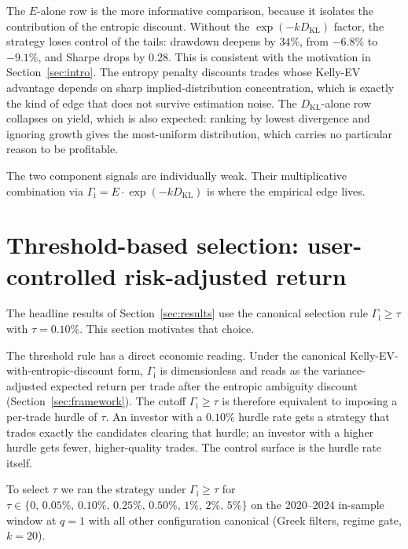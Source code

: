 \documentclass[11pt]{article}
\theoremstyle{definition}
\theoremstyle{remark}
\newcommand{\KL}{D_{\mathrm{KL}}}
\newcommand{\GROUND}{\Gamma_{\mathrm{i}}}
\begin{document}
The $E$-alone row is the more informative comparison, because it
isolates the contribution of the entropic discount. Without the
$\exp(-k \KL)$ factor, the strategy loses control of the tails:
drawdown deepens by $34\%$, from $-6.8\%$ to $-9.1\%$, and
Sharpe drops by $0.28$. This is consistent with the motivation in
Section~\ref{sec:intro}. The entropy penalty discounts trades whose
Kelly-EV advantage depends on sharp implied-distribution
concentration, which is exactly the kind of edge that does not
survive estimation noise. The $\KL$-alone row collapses on yield,
which is also expected: ranking by lowest divergence and ignoring
growth gives the most-uniform distribution, which carries no
particular reason to be profitable.

The two component signals are individually weak. Their
multiplicative combination via $\GROUND = E \cdot \exp(-k \KL)$ is
where the empirical edge lives.

\section{Threshold-based selection: user-controlled risk-adjusted return}\label{sec:threshold}

The headline results of Section~\ref{sec:results} use the canonical
selection rule $\GROUND \geq \tau$ with $\tau = 0.10\%$. This
section motivates that choice.

The threshold rule has a direct economic reading. Under the
canonical Kelly-EV-with-entropic-discount form, $\GROUND$ is
dimensionless and reads as the variance-adjusted expected return per trade
after the entropic ambiguity discount (Section~\ref{sec:framework}). The cutoff
$\GROUND \geq \tau$ is therefore equivalent to imposing a per-trade
hurdle of $\tau$. An investor with a $0.10\%$ hurdle rate gets
a strategy that trades exactly the candidates clearing that
hurdle; an investor with a higher hurdle gets fewer,
higher-quality trades. The control surface is the hurdle rate
itself.

To select $\tau$ we ran the strategy under $\GROUND \geq \tau$ for
$\tau \in \{0,\,0.05\%,\,0.10\%,\,0.25\%,\,0.50\%,\,1\%,\,2\%,\,5\%\}$
on the 2020--2024 in-sample window at $q = 1$ with all other
configuration canonical (Greek filters, regime gate, $k = 20$).
\end{document}
